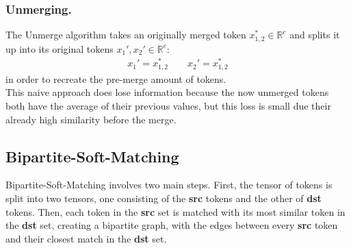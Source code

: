 \subsubsection*{Unmerging.} The Unmerge algorithm takes an originally merged token $x_{1,2}^* \in \mathbb{R}^c$ and splits it up into its original tokens $x_1', x_2' \in \mathbb{R}^c$: 
\begin{align*}
    x_1' = x_{1,2}^* \quad\quad
    x_2' = x_{1,2}^*
\end{align*}
in order to recreate the pre-merge amount of tokens.\\
This naive approach does lose information because the now unmerged tokens both have the average of their previous values, but this loss is small due their already high similarity before the merge.



\subsection{Bipartite-Soft-Matching}
Bipartite-Soft-Matching involves two main steps. First, the tensor of tokens is split into two tensors, one consisting of the \textbf{src} tokens and the other of \textbf{dst} tokens. Then, each token in the \textbf{src} set is matched with its most similar token in the \textbf{dst} set, creating a bipartite graph, with the edges between every \textbf{src} token and their closest match in the \textbf{dst} set. 



